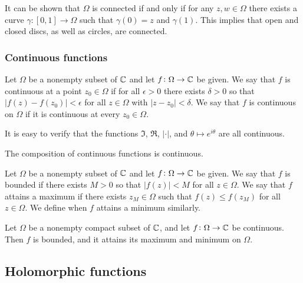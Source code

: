 \documentclass[11pt,a4paper]{article}
\begin{document}
\begin{remark}
  It can be shown that $\Omega$ is connected if and only if for any
  $z, w \in \Omega$ there exists a curve $\gamma \colon [0,1] \to \Omega$
  such that $\gamma(0) = z$ and $\gamma(1)$.
  This implies that open and closed discs, as well as circles, are
  connected.
\end{remark}

\subsubsection{Continuous functions}

\begin{definition}
  Let $\Omega$ be a nonempty subset of $\mathbb{C}$ and let 
  $f \colon \Omega \to \mathbb{C}$ be given.
  We say that $f$ is continuous at a point $z_0 \in \Omega$ 
  if for all $\epsilon > 0$ there exists $\delta > 0$ so
  that $|f(z) - f(z_0)| < \epsilon$ for all $z \in \Omega$ with 
  $|z - z_0| < \delta$.
  We say that $f$ is continuous on $\Omega$ if it is continuous at every 
  $z_0 \in \Omega$.
\end{definition}

\begin{remark}
  It is easy to verify that the functions $\Im$, $\Re$, $|\cdot|$, and
  $\theta \mapsto e^{i \theta}$ are all continuous.
\end{remark}

\begin{proposition}
  The composition of continuous functions is continuous.
\end{proposition}

\begin{definition}
  Let $\Omega$ be a nonempty subset of $\mathbb{C}$ and let 
  $f \colon \Omega \to \mathbb{C}$ be given.
  We say that $f$ is bounded if there exists $M > 0$ so that 
  $|f(z)| < M$ for all $z \in \Omega$.
  We say that $f$ attains a maximum if there exists $z_M \in \Omega$
  such that $f(z) \le f(z_M)$ for all $z \in \Omega$.
  We define when $f$ attains a minimum similarly.
\end{definition}

\begin{proposition}
  Let $\Omega$ be a nonempty compact subset of $\mathbb{C}$, and let 
  $f \colon \Omega \to \mathbb{C}$ be continuous.
  Then $f$ is bounded, and it attains its maximum and minimum on $\Omega$.
\end{proposition}

\subsection{Holomorphic functions}
\end{document}
